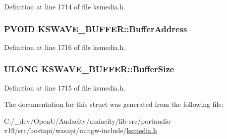 Definition at line 1714 of file ksmedia.\+h.

\subsubsection[{\texorpdfstring{Buffer\+Address}{BufferAddress}}]{\setlength{\rightskip}{0pt plus 5cm}P\+V\+O\+ID K\+S\+W\+A\+V\+E\+\_\+\+B\+U\+F\+F\+E\+R\+::\+Buffer\+Address}\hypertarget{struct_k_s_w_a_v_e___b_u_f_f_e_r_a07ab9f1bc09790b462c1742d8399c1e1}{}\label{struct_k_s_w_a_v_e___b_u_f_f_e_r_a07ab9f1bc09790b462c1742d8399c1e1}


Definition at line 1716 of file ksmedia.\+h.

\subsubsection[{\texorpdfstring{Buffer\+Size}{BufferSize}}]{\setlength{\rightskip}{0pt plus 5cm}U\+L\+O\+NG K\+S\+W\+A\+V\+E\+\_\+\+B\+U\+F\+F\+E\+R\+::\+Buffer\+Size}\hypertarget{struct_k_s_w_a_v_e___b_u_f_f_e_r_a7fe228703c11f73a581366e720a73984}{}\label{struct_k_s_w_a_v_e___b_u_f_f_e_r_a7fe228703c11f73a581366e720a73984}


Definition at line 1715 of file ksmedia.\+h.



The documentation for this struct was generated from the following file\+:\begin{DoxyCompactItemize}
\item 
C\+:/\+\_\+dev/\+Open\+U/\+Audacity/audacity/lib-\/src/portaudio-\/v19/src/hostapi/wasapi/mingw-\/include/\hyperlink{ksmedia_8h}{ksmedia.\+h}\end{DoxyCompactItemize}
